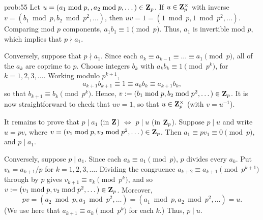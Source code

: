 \begin{sol}{prob:55} Let $u=(a_1\bmod{p}, ,a_2\bmod{p}, \dots) \in \mathbf{Z}_p$. If $u \in \mathbf{Z}_p^{\times}$ with inverse $v = (b_1\bmod{p}, b_2\bmod{p^2}, \dots)$, then $uv = 1 = (1\bmod{p}, 1\bmod{p^2},\dots)$. Comparing mod $p$ components, $a_1 b_1\equiv 1\pmod{p}$. Thus, $a_1$ is invertible mod $p$, which implies that $p\nmid a_1$. 

Conversely, suppose that $p\nmid a_1$. Since each $a_k \equiv a_{k-1} \equiv \dots \equiv a_1\pmod{p}$, all of the $a_k$ are coprime to $p$. Choose integers $b_k$ with $a_k b_k \equiv 1\pmod{p^{k}}$, for $k=1,2,3,\dots$. Working modulo $p^{k+1}$,
\[ a_{k+1} b_{k+1} \equiv 1 \equiv a_k b_k \equiv a_{k+1} b_k, \]
so that $b_{k+1} \equiv b_k\pmod{p^k}$. Hence, $v:= (b_1\bmod{p}, b_2\bmod{p^2},\dots) \in \mathbf{Z}_p$. It is now straightforward to check that $uv=1$, so that $u \in \mathbf{Z}_{p}^{\times}$ (with $v =u^{-1}$). 

It remains to prove that $p\mid a_1$ (in $\mathbf{Z}$) $\Longleftrightarrow$ $p\mid u$ (in $\mathbf{Z}_p$). Suppose $p\mid u$ and write $u=pv$, where $v=(v_1\bmod{p}, v_2\bmod{p^2},\dots) \in \mathbf{Z}_p$. Then $a_1\equiv pv_1 \equiv 0\pmod{p}$, and $p\mid a_1$. 

Conversely, suppose $p\mid a_1$. Since each $a_k \equiv a_1\pmod{p}$, $p$ divides every $a_k$. Put $v_k = a_{k+1}/p$ for $k=1,2,3,\dots$. Dividing the congruence $a_{k+2}\equiv a_{k+1}\pmod{p^{k+1}}$ through by $p$ gives $v_{k+1}\equiv v_k\pmod{p^k}$, and so $v:=(v_1\bmod{p},  v_2\bmod{p^2}, \dots) \in \mathbf{Z}_p$. Moreover,
\[ pv = (a_2\bmod{p}, a_3\bmod{p^2}, \dots) = (a_1\bmod{p}, a_2\bmod{p^2}, \dots) = u.\]
(We use here that $a_{k+1}\equiv a_k\pmod{p^k}$ for each $k$.) Thus, $p\mid u$.
\end{sol}

